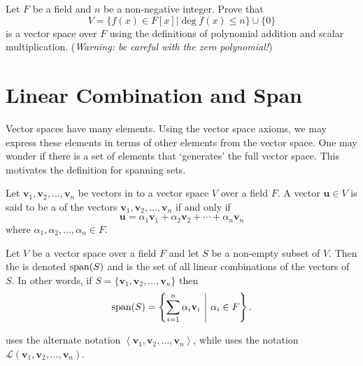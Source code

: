 \begin{exercise}
    Let $F$ be a field and $n$ be a non-negative integer. Prove that
    \[
        V = \{f(x) \in F[x] \vert \deg f(x) \leq n\} \cup \{0\}
    \]
    is a vector space over $F$ using the definitions of polynomial addition and scalar multiplication.\newline
    (\textit{Warning: be careful with the zero polynomial!})
\end{exercise}

\section{Linear Combination and Span}
Vector spaces have many elements. Using the vector space axioms, we may express these elements in terms of other elements from the vector space. One may wonder if there is a set of elements that `generates' the full vector space. This motivates the definition for spanning sets.

\begin{definition}
    Let $\mathbf{v}_1, \mathbf{v}_2, \dots, \mathbf{v}_n$ be vectors in to a vector space $V$ over a field $F$. A vector $\mathbf{u} \in V$ is said to be a  of the vectors $\mathbf{v}_1, \mathbf{v}_2, \dots, \mathbf{v}_n$ if and only if
    \[
        \mathbf{u} = \alpha_1\mathbf{v}_1 + \alpha_2\mathbf{v}_2 + \cdots + \alpha_n \mathbf{v}_n
    \]
    where $\alpha_1, \alpha_2, \dots, \alpha_n \in F$.
\end{definition}

\begin{definition}
    Let $V$ be a vector space over a field $F$ and let $S$ be a non-empty subset of $V$. Then the  is denoted $\mathrm{span}(S)$ and is the set of all linear combinations of the vectors of $S$. In other words, if $S = \{\mathbf{v}_1, \mathbf{v}_2, \dots, \mathbf{v}_n\}$ then
    \[
        \Span{S} = \left\{\sum_{i=1}^n \alpha_i\mathbf{v}_i \vert \alpha_i \in F\right\}.
    \]
\end{definition}
\begin{remark}
    \cite[p.~331]{gallian_2016} uses the alternate notation $\left\langle\mathbf{v}_1, \mathbf{v}_2, \dots, \mathbf{v}_n\right\rangle$, while \cite[p.~31]{treil_2017} uses the notation $\mathcal{L}\left(\mathbf{v}_1, \mathbf{v}_2, \dots, \mathbf{v}_n\right)$.
\end{remark}

